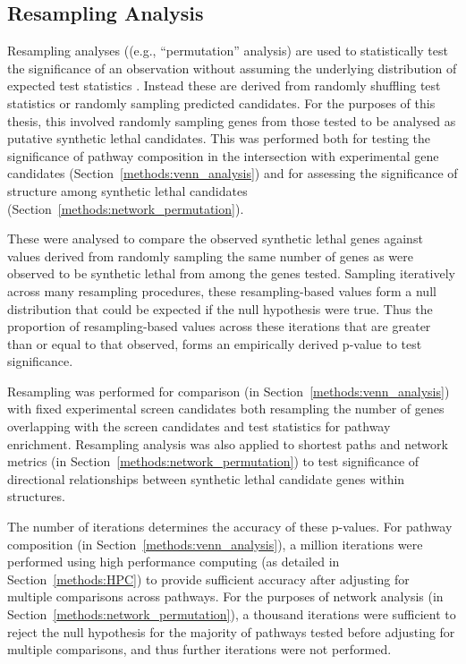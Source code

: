 \subsection{Resampling Analysis} \label{methods:permutation}
Resampling analyses ((e.g., ``permutation'' analysis) are used to statistically test the significance of an observation without assuming the underlying distribution of expected test statistics \citep{Collingridge2013}. Instead these are derived from randomly shuffling test statistics or randomly sampling predicted candidates. For the purposes of this thesis, this involved randomly sampling genes from those tested to be analysed as putative \gls{synthetic lethal} candidates. This was performed both for testing the significance of \gls{pathway} composition in the intersection with experimental gene candidates (Section~\ref{methods:venn_analysis}) and for assessing the significance of  structure among \gls{synthetic lethal} candidates (Section~\ref{methods:network_permutation}).

These were analysed to compare the observed \gls{synthetic lethal} genes against values derived from randomly sampling the same number of genes as were observed to be \gls{synthetic lethal} from among the genes tested. Sampling iteratively across many resampling procedures, these resampling-based values form a null distribution that could be expected if the null hypothesis were true. Thus the proportion of resampling-based values across these iterations that are greater than or equal to that observed, forms an empirically derived p-value to test significance.

Resampling was performed for comparison (in Section~\ref{methods:venn_analysis}) with fixed experimental screen candidates \citep{Telford2015} both resampling the number of genes overlapping with the screen candidates and test statistics for \gls{pathway} enrichment. Resampling analysis was also applied to \glspl{shortest path} and network metrics (in Section~\ref{methods:network_permutation}) to test significance of directional relationships between \gls{synthetic lethal} candidate genes within  structures.

The number of iterations determines the accuracy of these p-values. For \gls{pathway} composition (in Section~\ref{methods:venn_analysis}), a million iterations were performed using high performance computing (as detailed in Section~\ref{methods:HPC}) to provide sufficient accuracy after adjusting for multiple comparisons across \glspl{pathway}. For the purposes of network analysis (in Section~\ref{methods:network_permutation}), a thousand iterations were sufficient to reject the null hypothesis for the majority of \glspl{pathway} tested before adjusting for multiple comparisons, and thus further iterations were not performed.

